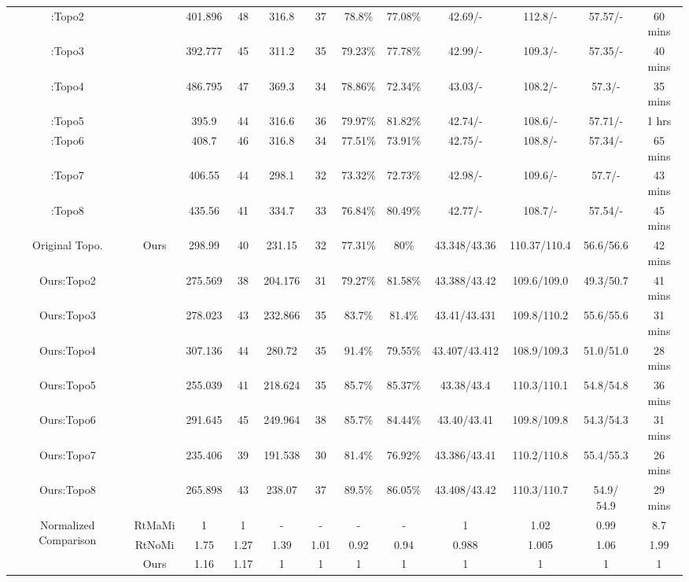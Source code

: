 \begin{table}
\begin{center}
\begin{tabular}{|c|c|c|c|c|c|c|c|c|c|c|c|}
            \cite{ALP_YPWeng_iccad2011}:Topo2 & & 401.896 & 48 & 316.8 & 37 & 78.8\% & 77.08\% & 42.69/- & 112.8/- & 57.57/- & 60 mins \\
            \cite{ALP_YPWeng_iccad2011}:Topo3 & & 392.777 & 45 & 311.2 & 35 & 79.23\% & 77.78\% & 42.99/- & 109.3/- & 57.35/- & 40 mins \\
            \cite{ALP_YPWeng_iccad2011}:Topo4 & & 486.795 & 47 & 369.3 & 34 & 78.86\% & 72.34\% & 43.03/- & 108.2/- & 57.3/- & 35 mins \\
            \cite{ALP_YPWeng_iccad2011}:Topo5 & & 395.9 & 44 & 316.6 & 36 & 79.97\% & 81.82\% & 42.74/- & 108.6/- & 57.71/- & 1 hrs \\
            \cite{ALP_YPWeng_iccad2011}:Topo6 & & 408.7 & 46 & 316.8 & 34 & 77.51\% & 73.91\% & 42.75/- & 108.8/- & 57.34/- & 65 mins\\
            \cite{ALP_YPWeng_iccad2011}:Topo7 & & 406.55 & 44 & 298.1 & 32 & 73.32\% & 72.73\% & 42.98/- & 109.6/- & 57.7/- & 43 mins \\
            \cite{ALP_YPWeng_iccad2011}:Topo8 & & 435.56 & 41 & 334.7 & 33 & 76.84\% & 80.49\% & 42.77/- & 108.7/- & 57.54/- & 45 mins \\
          \hline
            Original Topo. & \multirow{8}{*}{Ours} & 298.99 & 40 & 231.15 & 32 & 77.31\% & 80\% & 43.348/43.36 & 110.37/110.4 & 56.6/56.6 & 42 mins \\ \cline{1-1} \cline{3-12}
            Ours:Topo2 & & 275.569 & 38 & 204.176 & 31 & 79.27\% & 81.58\% & 43.388/43.42 & 109.6/109.0 & 49.3/50.7  &  41 mins \\
            Ours:Topo3 & & 278.023 & 43 & 232.866 & 35 & 83.7\% & 81.4\% &  43.41/43.431 & 109.8/110.2 & 55.6/55.6 & 31 mins \\
            Ours:Topo4 & & 307.136 & 44 & 280.72 & 35 & 91.4\% & 79.55\% & 43.407/43.412 & 108.9/109.3 & 51.0/51.0 &  28 mins \\
            Ours:Topo5 & & 255.039 & 41 & 218.624 & 35 & 85.7\% & 85.37\% & 43.38/43.4&  110.3/110.1 & 54.8/54.8 & 36 mins \\
            Ours:Topo6 & & 291.645 & 45 & 249.964 & 38 & 85.7\% & 84.44\% &  43.40/43.41 &  109.8/109.8 & 54.3/54.3 & 31 mins \\
            Ours:Topo7 & & 235.406 & 39 & 191.538 & 30 & 81.4\% & 76.92\% &  43.386/43.41&  110.2/110.8 &  55.4/55.3 &  26 mins \\
            Ours:Topo8 & & 265.898 & 43 & 238.07 & 37 & 89.5\% & 86.05\% &  43.408/43.42 &  110.3/110.7 & 54.9/ 54.9 &  29 mins \\
          \hline
            \multirow{3}{1.5cm}{Normalized  Comparison} & 
              RtMaMi    & 1 & 1 &- &- & - & - &  1 & 1.02 &  0.99 & 8.7  \\
              \cline{2-12}
              & RtNoMi  & 1.75  & 1.27 & 1.39 &  1.01 & 0.92 & 0.94 & 0.988 & 1.005 &  1.06 & 1.99   \\
              \cline{2-12}
              & Ours    & {1.16}  & 1.17 & 1    & 1   &  1  & 1 &  1 &  1 & 1 &  1 \\
          \hline


\end{tabular}
\end{center}
\end{table}
